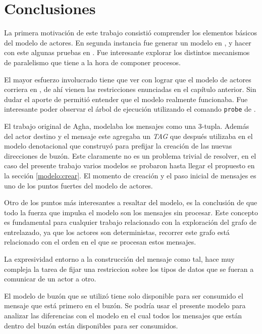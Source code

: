 \chapter{Conclusiones}

La primera motivación de este trabajo consistió comprender los elementos básicos del modelo de actores. En segunda instancia fue generar un modelo en \CSP, y hacer con este algunas pruebas en \FDR. Fue interesante explorar los distintos mecanismos de paralelismo que tiene \CSP a la hora de componer procesos. 

El mayor esfuerzo involucrado tiene que ver con lograr que el modelo de actores corriera en \FDR, de ahí vienen las restricciones enunciadas en el capítulo anterior. Sin dudar el aporte de \FDR permitió entender que el modelo realmente funcionaba. Fue interesante poder observar el árbol de ejecución utilizando el comando \verb=probe= de \FDR. 

El trabajo original de Agha\cite{Agha:1986:AMC:7929}, modelaba los mensajes como una 3-tupla. Además del actor destino y el mensaje este agregaba un \textit{TAG} que después utilizaba en el modelo denotacional que construyó para prefijar la creación de las nuevas direcciones de buzón. Este claramente no es un problema trivial de resolver, en el caso del presente trabajo varios modelos se probaron hasta llegar el propuesto en la sección \ref{modelo:crear}. El momento de creación y el paso inicial de mensajes es uno de los puntos fuertes del modelo de actores.

Otro de los puntos más interesantes a resaltar del modelo, es la conclusión de que todo la fuerza que impulsa el modelo son los mensajes sin procesar. Este concepto es fundamental para cualquier trabajo relacionado con la exploración del grafo de entrelazado, ya que los actores son deterministas, recorrer este grafo está relacionado con el orden en el que se procesan estos mensajes.

La expresividad entorno a la construcción del mensaje como tal, hace muy compleja la tarea de fijar una restriccion sobre los tipos de datos que se fueran a comunicar de un actor a otro.

El modelo de buzón que se utilizó tiene solo disponible para ser consumido el mensaje que está primero en el buzón. Se podría usar el presente modelo para analizar las diferencias con el modelo en el cual todos los mensajes que están dentro del buzón están disponibles para ser consumidos.
